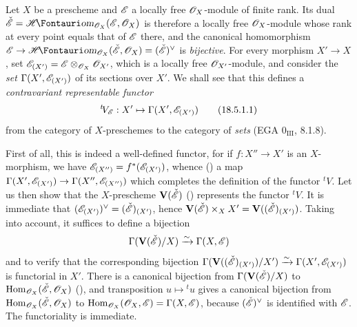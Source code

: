 \begin{env}[18.5.1]
\label{IV.18.5.1}
Let $X$ be a prescheme and $\mathscr{E}$ a locally free $\mathscr{O}_X$-module of finite rank.
Its dual $\check{\sh{E}}=\shHom_{\sh{O}_X}(\sh{E},\sh{O}_X)$ is therefore a locally free $\mathscr{O}_X$-module whose rank at every point equals that of $\mathscr{E}$ there, and the canonical homomorphism $\sh{E}\to\shHom_{\sh{O}_X}(\check{\sh{E}},\sh{O}_X)=(\check{\sh{E}})^\vee$ is \emph{bijective}.
For every morphism $X'\to X$, set $\mathscr{E}_{(X')}=\mathscr{E}\otimes_{\mathscr{O}_X}\mathscr{O}_{X'}$, which is a locally free $\mathscr{O}_{X'}$-module, and consider the \emph{set} $\Gamma(X',\mathscr{E}_{(X')})$ of its sections over $X'$.
We shall see that this defines a \emph{contravariant representable functor}
\[
\label{IV.18.5.1.1}
{}^t\! V_{\mathscr{E}}:X'\mapsto\Gamma(X',\mathscr{E}_{(X')})
\tag{18.5.1.1}
\]
from the category of $X$-preschemes to the category of \emph{sets} (EGA $0_{\mathrm{III}}$, 8.1.8).

First of all, this is indeed a well-defined functor, for if $f:X''\to X'$ is an $X$-morphism, we have $\mathscr{E}_{(X'')}=f^*(\mathscr{E}_{(X')})$, whence () a map $\Gamma(X',\mathscr{E}_{(X')})\to\Gamma(X'',\mathscr{E}_{(X'')})$ which completes the definition of the functor ${}^t\! V$.
Let us then show that the $X$-prescheme $\mathbf{V}(\check{\mathscr{E}})$ () represents the functor ${}^t\! V$.
It is immediate that $(\mathscr{E}_{(X')})^\vee=(\check{\mathscr{E}})_{(X')}$, hence $\mathbf{V}(\check{\mathscr{E}})\times_X X'=\mathbf{V}((\check{\mathscr{E}})_{(X')})$.
Taking  into account, it suffices to define a bijection
\[
\Gamma(\mathbf{V}(\check{\mathscr{E}})/X)\xrightarrow{\sim}\Gamma(X,\mathscr{E})
\]
and to verify that the corresponding bijection $\Gamma(\mathbf{V}((\check{\mathscr{E}})_{(X')})/X')\xrightarrow{\sim}\Gamma(X',\mathscr{E}_{(X')})$ is functorial in $X'$.
There is a canonical bijection from $\Gamma(\mathbf{V}(\check{\mathscr{E}})/X)$ to $\operatorname{Hom}_{\mathscr{O}_X}(\check{\mathscr{E}},\mathscr{O}_X)$ (), and transposition $u\mapsto{}^t u$ gives a canonical bijection from $\operatorname{Hom}_{\mathscr{O}_X}(\check{\mathscr{E}},\mathscr{O}_X)$ to $\operatorname{Hom}_{\mathscr{O}_X}(\mathscr{O}_X,\mathscr{E})=\Gamma(X,\mathscr{E})$, because $(\check{\mathscr{E}})^\vee$ is identified with $\mathscr{E}$.
The functoriality is immediate.


\end{env}
